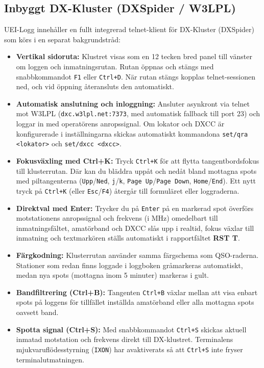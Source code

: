 \documentclass[11pt,a4paper]{article}
\begin{document}
\subsection{Inbyggt DX-Kluster (DXSpider / W3LPL)}
\label{sec:dxcluster}
UEI-Logg innehåller en fullt integrerad telnet-klient för DX-Kluster (DXSpider) som körs i en separat bakgrundstråd:
\begin{itemize}
    \item \textbf{Vertikal sidoruta:} Klustret visas som en 12 tecken bred panel till vänster om loggen och inmatningsrutan. Rutan öppnas och stängs med snabbkommandot \texttt{F1} eller \texttt{Ctrl+D}. När rutan stängs kopplas telnet-sessionen ned, och vid öppning återansluts den automatiskt.
    \item \textbf{Automatisk anslutning och inloggning:} Ansluter asynkront via telnet mot W3LPL (\texttt{dxc.w3lpl.net:7373}, med automatisk fallback till port 23) och loggar in med operatörens anropssignal. Om lokator och DXCC är konfigurerade i inställningarna skickas automatiskt kommandona \texttt{set/qra <lokator>} och \texttt{set/dxcc <dxcc>}.
    \item \textbf{Fokusväxling med Ctrl+K:} Tryck \texttt{Ctrl+K} för att flytta tangentbordsfokus till klusterrutan. Där kan du bläddra uppåt och nedåt bland mottagna spots med piltangenterna (\texttt{Upp}/\texttt{Ned}, \texttt{j}/\texttt{k}, \texttt{Page Up}/\texttt{Page Down}, \texttt{Home}/\texttt{End}). Ett nytt tryck på \texttt{Ctrl+K} (eller \texttt{Esc}/\texttt{F4}) återgår till formuläret eller loggraderna.
    \item \textbf{Direktval med Enter:} Trycker du på \texttt{Enter} på en markerad spot överförs motstationens anropssignal och frekvens (i MHz) omedelbart till inmatningsfältet, amatörband och DXCC slås upp i realtid, fokus växlar till inmatning och textmarkören ställs automatiskt i rapportfältet \textbf{RST T}.
    \item \textbf{Färgkodning:} Klusterrutan använder samma färgschema som QSO-raderna. Stationer som redan finns loggade i loggboken gråmarkeras automatiskt, medan nya spots (mottagna inom 5 minuter) markeras i gult.
    \item \textbf{Bandfiltrering (Ctrl+B):} Tangenten \texttt{Ctrl+B} växlar mellan att visa enbart spots på loggens för tillfället inställda amatörband eller alla mottagna spots oavsett band.
    \item \textbf{Spotta signal (Ctrl+S):} Med snabbkommandot \texttt{Ctrl+S} skickas aktuell inmatad motstation och frekvens direkt till DX-klustret. Terminalens mjukvaruflödesstyrning (\texttt{IXON}) har avaktiverats så att \texttt{Ctrl+S} inte fryser terminalutmatningen.
\end{itemize}
\end{document}
